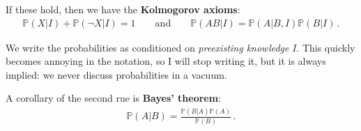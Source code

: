 \documentclass[main.tex]{subfiles}
\begin{document}

If these hold, then we have the \textbf{Kolmogorov axioms}: 
%
\begin{align}
\mathbb{P}(X|I) + \mathbb{P}(\neg X|I) = 1
\qquad \text{and} \qquad
\mathbb{P}(AB|I) = \mathbb{P}(A|B, I) \mathbb{P}(B|I)
\,.
\end{align}

We write the probabilities as conditioned on \emph{preexisting knowledge} \(I\). This quickly becomes annoying in the notation, so I will stop writing it, but it is always implied: we never discuss probabilities in a vacuum.

A corollary of the second rue is \textbf{Bayes' theorem}: 
%
\begin{align}
\mathbb{P}(A|B) = \frac{\mathbb{P}(B|A) \mathbb{P}(A)}{\mathbb{P}(B)}
\,.
\end{align}
\end{document}
